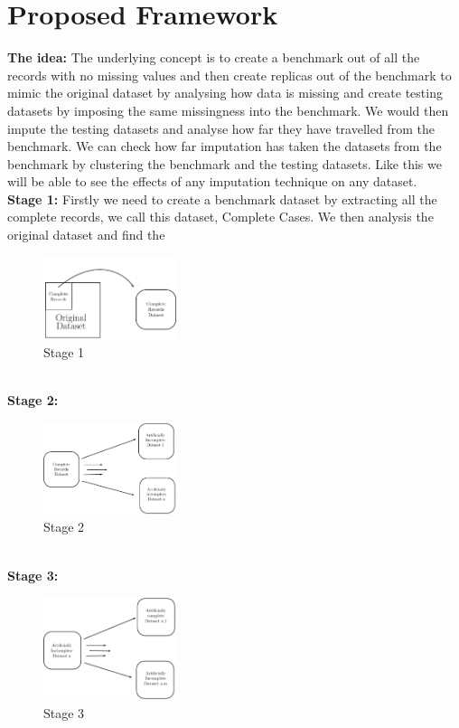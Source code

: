 \documentclass{IEEEconf}
\begin{document}
	\section{Proposed Framework} %
	\label{sec:proposed_framework}
		\textbf{The idea:} The underlying concept is to create a benchmark out of all the records with no missing values and then create replicas out of the benchmark to mimic the original dataset by analysing how data is missing and create testing datasets by imposing the same missingness into the benchmark. We would then impute the testing datasets and analyse how far they have travelled from the benchmark. We can check how far imputation has taken the datasets from the benchmark by clustering the benchmark and the testing datasets. Like this we will be able to see the effects of any imputation technique on any dataset. 
		\\
		\indent \textbf{Stage 1:}
		Firstly we need to create a benchmark dataset by extracting all the complete records, we call this dataset, Complete Cases. We then analysis the original dataset and find the 
		\begin{figure}[!ht]
			\caption{Stage 1}
			\centering
			\includegraphics[width=0.35\textwidth]{stage1.pdf}
		\end{figure}
		\\
		\indent \textbf{Stage 2:}
		\begin{figure}[!ht]
			\caption{Stage 2}
			\centering
			\includegraphics[width=0.35\textwidth]{stage22.pdf}
		\end{figure}
		\\
		\indent \textbf{Stage 3:}
		\begin{figure}[!ht]
			\caption{Stage 3}
			\centering
			\includegraphics[width=0.35\textwidth]{stage32.pdf}
		\end{figure}
\end{document}
